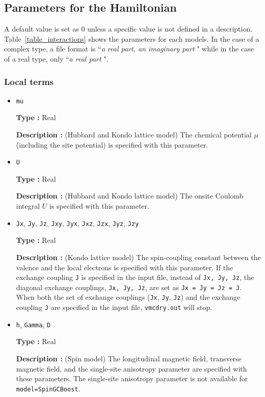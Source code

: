 \subsection{Parameters for the Hamiltonian}
A default value is set as $0$ unless a specific value is not defined in a description. 
Table~\ref{table_interactions} shows the parameters for each models. 
In the case of a complex type, a file format is ``{\it a real part, an imaginary part} "
 while in the case of a real type, only ``{\it a real part} ".


\subsubsection{Local terms}

\begin{itemize}

\item \verb|mu|

{\bf Type :} Real

{\bf Description :} (Hubbard and Kondo lattice model) 
The chemical potential $\mu$ (including the site potential)
is specified with this parameter.

\item \verb|U|

{\bf Type :} Real

{\bf Description :} (Hubbard and Kondo lattice model) 
The onsite Coulomb integral $U$ is specified with this parameter.

\item \verb|Jx|, \verb|Jy|, \verb|Jz|, \verb|Jxy|, 
  \verb|Jyx|, \verb|Jxz|, \verb|Jzx|, \verb|Jyz|, \verb|Jzy|

{\bf Type :} Real

{\bf Description :} (Kondo lattice model) 
The spin-coupling constant between the valence and the local electrons
is specified with this parameter.
If the exchange coupling \verb|J| is specified in the input file,
instead of \verb|Jx, Jy, Jz|,
the diagonal exchange couplings, \verb|Jx, Jy, Jz|, are set as \verb|Jx = Jy = Jz = J|.
When both
the set of exchange couplings (\verb|Jx|, \verb|Jy|, \verb|Jz|)
and the exchange coupling \verb|J| are specified in the input file,
\verb|vmcdry.out| will stop.

\item \verb|h|, \verb|Gamma|, \verb|D|

{\bf Type :} Real

{\bf Description :} (Spin model)
The longitudinal magnetic field, transverse magnetic field, 
and the single-site anisotropy parameter are specified with these parameters.
The single-site anisotropy parameter is not available for \verb|model=SpinGCBoost|.

\end{itemize}

